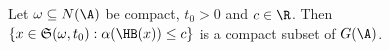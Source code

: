 Let $\omega\subseteq N(\A)$ be compact, $t_0>0$ and $c\in\R$. Then
$\{x\in\mathfrak S(\omega,t_0):\alpha(\HB(x))\le c\}$ is a compact subset of $G(\A)$.
